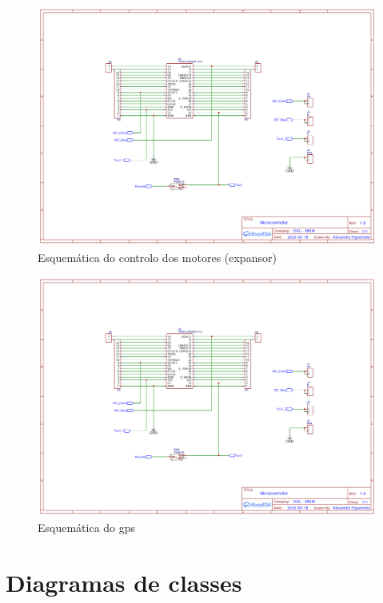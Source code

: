 \begin{figure}[H]
  \centering
  \includegraphics[page=4,width=\textwidth,height=\textheight,keepaspectratio]{anexos/esquematica.pdf}
  \caption{Esquemática do controlo dos motores (expansor)}
  \label{fig:esquematica-expander}
\end{figure}
\vspace{-0.2cm}
\begin{figure}[H]
  \centering
  \includegraphics[page=5,width=\textwidth,height=\textheight,keepaspectratio]{anexos/esquematica.pdf}
  \caption{Esquemática do \gls{gps}}
  \label{fig:esquematica-gps}
\end{figure}

\chapter{Diagramas de classes}
\label{anexo:diagramas-de-classes}

